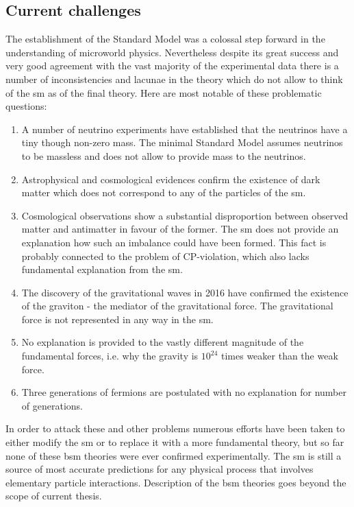 \subsection{Current challenges}

The establishment of the Standard Model was a colossal step forward in the understanding of microworld physics. Nevertheless despite its great success and very good agreement with the vast majority of the experimental data there is a number of inconsistencies and lacunae in the theory which do not allow to think of the \gls{sm} as of the final theory. Here are most notable of these problematic questions:
\begin{enumerate}
	\item A number of neutrino experiments have established that the neutrinos have a tiny though non-zero mass. The minimal Standard Model assumes neutrinos to be massless and does not allow to provide mass to the neutrinos. 
	\item Astrophysical and cosmological evidences confirm the existence of dark matter which does not correspond to any of the particles of the \gls{sm}. 
	\item Cosmological observations show a substantial disproportion between observed matter and antimatter in favour of the former. The \gls{sm} does not provide an explanation how such an imbalance could have been formed. This fact is probably connected to the problem of CP-violation, which also lacks fundamental explanation from the \gls{sm}.
	\item The discovery of the gravitational waves in 2016 have confirmed the existence of the graviton - the mediator of the gravitational force. The gravitational force is not represented in any way in the \gls{sm}.
	\item No explanation is provided to the vastly different magnitude of the fundamental forces, i.e. why the gravity is $10^{24}$ times weaker than the weak force. 
	\item Three generations of fermions are postulated with no explanation for number of generations. 
\end{enumerate}

In order to attack these and other problems numerous efforts have been taken to either modify the \gls{sm} or to replace it with a more fundamental theory, but so far none of these \gls{bsm} theories were ever confirmed experimentally. The \gls{sm} is still a source of most accurate predictions for any physical process that involves elementary particle interactions. Description of the \gls{bsm} theories goes beyond the scope of current thesis. 

